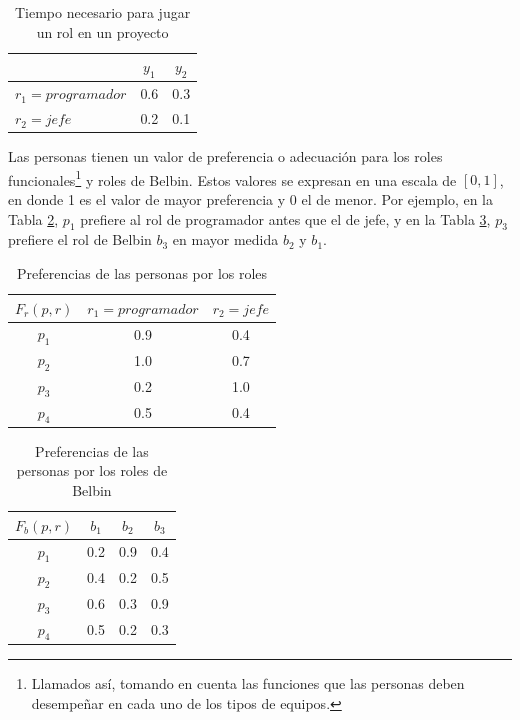 \begin{table}[H]
  \centering
  \caption{Tiempo necesario para jugar un rol en un proyecto}\label{tr-sof}
\begin{tabular}{|l|c|c|}
	\hline
	\thead{$T(r,y)$}  & $y_1$ & $y_2$ \\ \hline
	$r_1=programador$ &  0.6  &  0.3  \\ \hline
	$r_2=jefe$        &  0.2  &  0.1  \\ \hline
\end{tabular}
\end{table}


Las personas tienen un valor de preferencia o adecuación para los roles funcionales\footnote{Llamados así, tomando en cuenta las funciones que las personas deben desempeñar en cada uno de los tipos de equipos.} y roles de Belbin. Estos valores se expresan en una escala de $[0, 1]$, en donde 1 es el valor de mayor preferencia y 0 el de menor. Por ejemplo, en la Tabla \ref{pr-sof}, $p_1$ prefiere al rol de programador antes que el de jefe, y en la Tabla \ref{prb-sof}, $p_3$ prefiere el rol de Belbin $b_3$ en mayor medida $b_2$ y $b_1$.

\begin{table}[H]
  \centering
  \caption{Preferencias de las personas por los roles}\label{pr-sof}
\begin{tabular}{|c|c|c|}
	\hline
	$F_r(p,r)$ & $r_1=programador$ & $r_2=jefe$ \\ \hline
	  $p_1$    &        0.9        &    0.4     \\ \hline
	  $p_2$    &        1.0        &    0.7     \\ \hline
	  $p_3$    &        0.2        &    1.0     \\ \hline
	  $p_4$    &        0.5        &    0.4     \\ \hline
\end{tabular}
\end{table}

\begin{table}[H]
  \centering
  \caption{Preferencias de las personas por los roles de Belbin}\label{prb-sof}
\begin{tabular}{|c|c|c|c|}
	\hline
	$F_b(p,r)$ & $b_1$ & $b_2$ & $b_3$ \\ \hline
	  $p_1$    &  0.2  &  0.9  &  0.4  \\ \hline
	  $p_2$    &  0.4  &  0.2  &  0.5  \\ \hline
	  $p_3$    &  0.6  &  0.3  &  0.9  \\ \hline
	  $p_4$    &  0.5  &  0.2  &  0.3  \\ \hline
\end{tabular}
\end{table}



